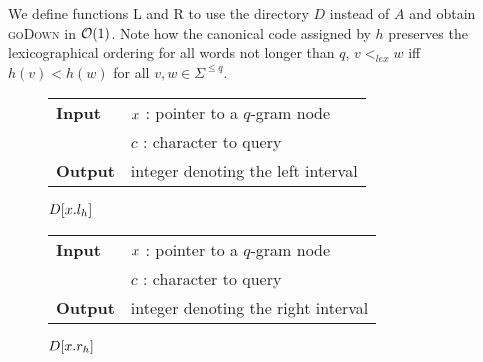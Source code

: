 We define functions \textsc{L} and \textsc{R} to use the directory $D$ instead of $A$ and obtain \textsc{goDown} in $\mathcal{O}(1)$.
Note how the canonical code assigned by $h$ preserves the lexicographical ordering for all words not longer than $q$, \ie $v <_{lex} w$ iff $h(v) < h(w)$ for all $v,w \in \Sigma^{\leq q}$.

\begin{figure*}
\begin{minipage}[t]{.5\textwidth}
\begin{algorithm}[H]
\label{alg:qgram-lower}
\begin{tabular}{ll}
\textbf{Input}  & $x$ : pointer to a $q$-gram node\\
				& $c$ : character to query\\
\textbf{Output} & integer denoting the left interval\\
\end{tabular}
\begin{algorithmic}[1]
\State \Return $D[x.l_h]$
\end{algorithmic}
\end{algorithm}
\end{minipage}
\hfill
\begin{minipage}[t]{.5\textwidth}
\begin{algorithm}[H]
\label{alg:qgram-upper}
\begin{tabular}{ll}
\textbf{Input}  & $x$ : pointer to a $q$-gram node\\
				& $c$ : character to query\\
\textbf{Output} & integer denoting the right interval\\
\end{tabular}
\begin{algorithmic}[1]
\State \Return $D[x.r_h]$
\end{algorithmic}
\end{algorithm}
\end{minipage}
\end{figure*}

